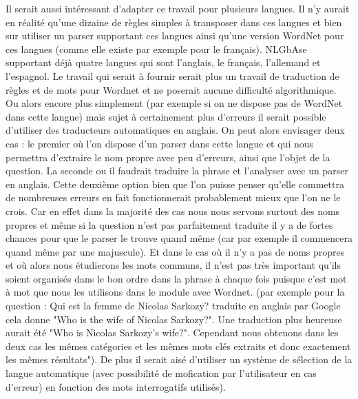\documentclass[10pt,a4paper]{article}
\begin{document}
\par Il serait aussi intéressant d'adapter ce travail pour plusieurs langues. Il n'y aurait en réalité qu'une dizaine de règles simples à transposer dans ces langues et bien sur utiliser un parser supportant ces langues ainsi qu'une version WordNet pour ces langues (comme elle existe par exemple pour le français). NLGbAse supportant déjà quatre langues qui sont l'anglais, le français, l'allemand et l'espagnol. Le travail qui serait à fournir serait plus un travail de traduction de règles et de mots pour Wordnet et ne poserait aucune difficulté algorithmique. Ou alors encore plus simplement (par exemple si on ne dispose pas de WordNet dans cette langue) mais sujet à certainement plus d'erreurs il serait possible d'utiliser des traducteurs automatiques en anglais. On peut alors envisager deux cas : le premier où l'on dispose d'un parser dans cette langue et qui nous permettra d'extraire le nom propre avec peu d'erreurs, ainsi que l'objet de la question. La seconde ou il faudrait traduire la phrase et l'analyser avec un parser en anglais. Cette deuxième option bien que l'on puisse penser qu'elle commettra de nombreuses erreurs en fait fonctionnerait probablement mieux que l'on ne le crois. Car en effet dans la majorité des cas nous nous servons surtout des noms propres et même si la question n'est pas parfaitement traduite il y a de fortes chances pour que le parser le trouve quand même (car par exemple il commencera quand même par une majuscule). Et dans le cas où il n'y a pas de noms propres et où alors nous étudierons les mots communs, il n'est pas très important qu'ils soient organisés dans le bon ordre dans la phrase à chaque fois puisque c'est mot à mot que nous les utilisons dans le module avec Wordnet. (par exemple pour la question : Qui est la femme de Nicolas Sarkozy? traduite en anglais par Google cela donne "Who is the wife of Nicolas Sarkozy?". Une traduction plus heureuse aurait été "Who is Nicolas Sarkozy's wife?". Cependant nous obtenons dans les deux cas les mêmes catégories et les mêmes mots clés extraits et donc exactement les mêmes résultats"). De plus il serait aisé d'utiliser un système de sélection de la langue automatique (avec possibilité de mofication par l'utilisateur en cas d'erreur) en fonction des mots interrogatifs utilisés).

\end{document}
